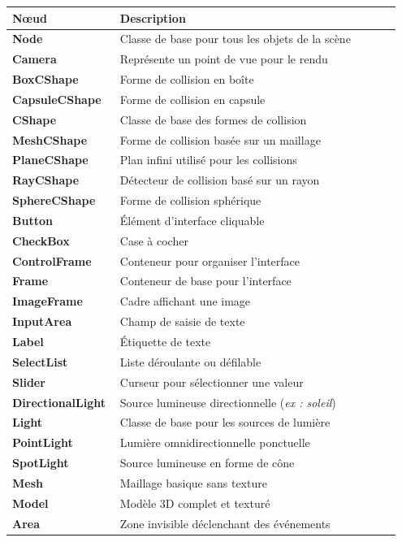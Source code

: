     \begin{longtable}{>{\bfseries}p{0.25\linewidth} p{0.7\linewidth}}
        \toprule
        \textbf{Nœud} & \textbf{Description} \\
        \midrule
        Node & Classe de base pour tous les objets de la scène \\
        Camera & Représente un point de vue pour le rendu \\
        BoxCShape & Forme de collision en boîte \\
        CapsuleCShape & Forme de collision en capsule \\
        CShape & Classe de base des formes de collision \\
        MeshCShape & Forme de collision basée sur un maillage \\
        PlaneCShape & Plan infini utilisé pour les collisions \\
        RayCShape & Détecteur de collision basé sur un rayon \\
        SphereCShape & Forme de collision sphérique \\
        Button & Élément d'interface cliquable \\
        CheckBox & Case à cocher \\
        ControlFrame & Conteneur pour organiser l'interface \\
        Frame & Conteneur de base pour l'interface \\
        ImageFrame & Cadre affichant une image \\
        InputArea & Champ de saisie de texte \\
        Label & Étiquette de texte \\
        SelectList & Liste déroulante ou défilable \\
        Slider & Curseur pour sélectionner une valeur \\
        DirectionalLight & Source lumineuse directionnelle (\textit{ex : soleil}) \\
        Light & Classe de base pour les sources de lumière \\
        PointLight & Lumière omnidirectionnelle ponctuelle \\
        SpotLight & Source lumineuse en forme de cône \\
        Mesh & Maillage basique sans texture \\
        Model & Modèle 3D complet et texturé \\
        Area & Zone invisible déclenchant des événements \\

\end{longtable}
